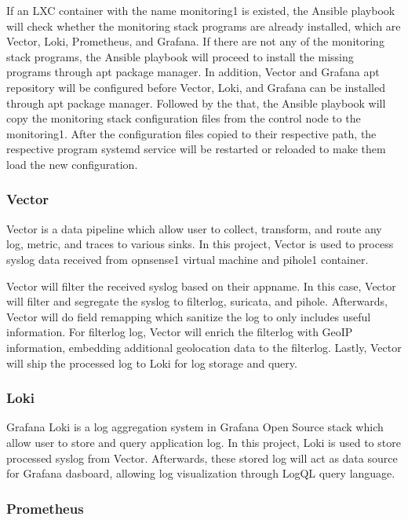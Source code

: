 \documentclass[../index.tex]{subfiles}
\begin{document}
If an LXC container with the name monitoring1 is existed, the Ansible playbook will check whether
the monitoring stack programs are already installed, which are Vector, Loki, Prometheus, and
Grafana. If there are not any of the monitoring stack programs, the Ansible playbook will proceed to
install the missing programs through apt package manager. In addition, Vector and Grafana apt
repository will be configured before Vector, Loki, and Grafana can be installed through apt package
manager. Followed by the that, the Ansible playbook will copy the monitoring stack configuration
files from the control node to the monitoring1. After the configuration files copied to their
respective path, the respective program systemd service will be restarted or reloaded to make them
load the new configuration.

\subsubsection{Vector}

Vector is a data pipeline which allow user to collect, transform, and route any log, metric, and
traces to various sinks. In this project, Vector is used to process syslog data received from
opnsense1 virtual machine and pihole1 container.

Vector will filter the received syslog based on their appname. In this case, Vector will filter and
segregate the syslog to filterlog, suricata, and pihole. Afterwards, Vector will do field remapping
which sanitize the log to only includes useful information. For filterlog log, Vector will enrich
the filterlog with GeoIP information, embedding additional geolocation data to the filterlog.
Lastly, Vector will ship the processed log to Loki for log storage
and query.

\subsubsection{Loki}

Grafana Loki is a log aggregation system in Grafana Open Source stack which allow user to store and
query application log. In this project, Loki is used to store processed syslog from Vector.
Afterwards, these stored log will act as data source for Grafana dasboard, allowing log
visualization through LogQL query language.

\subsubsection{Prometheus}
\end{document}
